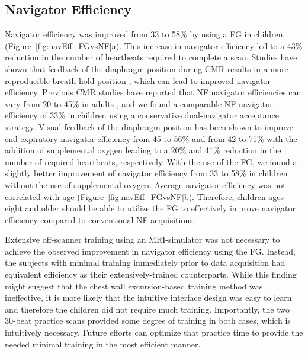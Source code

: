 	\subsection{Navigator Efficiency}
		Navigator efficiency was improved from 33 to 58\% by using a FG in children (Figure~\ref{fig:navEff_FGvsNF}a). This increase in navigator efficiency led to a 43\% reduction in the number of heartbeats required to complete a scan. Studies have shown that feedback of the diaphragm position during CMR results in a more reproducible breath-hold position \cite{Feuerlein2009,Jhooti2011,Kim2012}, which can lead to improved navigator efficiency. Previous CMR studies have reported that NF navigator efficiencies can vary from 20 to 45\% in adults \cite{Abd-Elmoniem2011,Feuerlein2009,Jhooti2011,Wang1996}, and we found a comparable NF navigator efficiency of 33\% in children using a conservative dual-navigator acceptance strategy. Visual feedback of the diaphragm position has been shown to improve end-expiratory navigator efficiency from 45 to 56\% \cite{Jhooti2011} and from 42 to 71\% with the addition of supplemental oxygen \cite{Feuerlein2009} leading to a 20\% and 41\% reduction in the number of required heartbeats, respectively. With the use of the FG, we found a slightly better improvement of navigator efficiency from 33 to 58\% in children without the use of supplemental oxygen. Average navigator efficiency was not correlated with age (Figure~\ref{fig:navEff_FGvsNF}b). Therefore, children ages eight and older should be able to utilize the FG to effectively improve navigator efficiency compared to conventional NF acquisitions.
		
		Extensive off-scanner training using an MRI-simulator was not necessary to achieve the observed improvement in navigator efficiency using the FG. Instead, the subjects with minimal training immediately prior to data acquisition had equivalent efficiency as their extensively-trained counterparts. While this finding might suggest that the chest wall excursion-based training method was ineffective, it is more likely that the intuitive interface design was easy to learn and therefore the children did not require much training. Importantly, the two 30-beat practice scans provided some degree of training in both cases, which is intuitively necessary. Future efforts can optimize that practice time to provide the needed minimal training in the most efficient manner.
	
